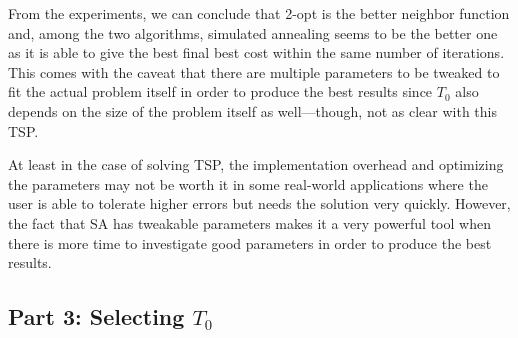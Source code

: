 From the experiments, we can conclude that 2-opt is the better neighbor function and, among the two algorithms, simulated annealing seems to be the better one as it is able to give the best final best cost within the same number of iterations. This comes with the caveat that there are multiple parameters to be tweaked to fit the actual problem itself in order to produce the best results since \(T_0\) also depends on the size of the problem itself as well---though, not as clear with this TSP.

At least in the case of solving TSP, the implementation overhead and optimizing the parameters may not be worth it in some real-world applications where the user is able to tolerate higher errors but needs the solution very quickly. However, the fact that SA has tweakable parameters makes it a very powerful tool when there is more time to investigate good parameters in order to produce the best results.

\subsection*{Part 3: Selecting \(T_0\)}

